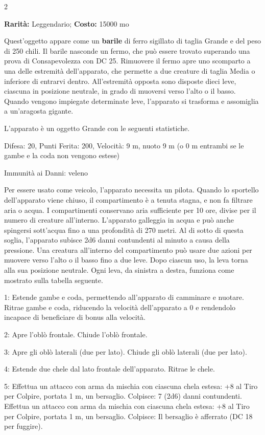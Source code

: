\begin{multicols}{2}

\textbf{Rarità:} Leggendario; \textbf{Costo:} 15000 mo

Quest'oggetto appare come un \textbf{barile} di ferro sigillato di taglia Grande e del peso di 250 chili. Il barile nasconde un fermo, che può essere trovato superando una prova di Consapevolezza con DC 25. Rimuovere il fermo apre uno scomparto a una delle estremità dell'apparato, che permette a due creature di taglia Media o inferiore di entrarvi dentro. All'estremità opposta sono disposte dieci leve, ciascuna in posizione neutrale, in grado di muoversi verso l'alto o il basso. Quando vengono impiegate determinate leve, l'apparato si trasforma e assomiglia a un'aragosta gigante.

L'apparato è un oggetto Grande con le seguenti statistiche.

Difesa: 20, Punti Ferita: 200, Velocità: 9 m, nuoto 9 m (o 0 m entrambi se le gambe e la coda non vengono estese)

Immunità ai Danni: veleno

Per essere usato come veicolo, l'apparato necessita un pilota. Quando lo sportello dell'apparato viene chiuso, il compartimento è a tenuta stagna, e non fa filtrare aria o acqua. I compartimenti conservano aria sufficiente per 10 ore, divise per il numero di creature all'interno. L'apparato galleggia in acqua e può anche spingersi sott'acqua fino a una profondità di 270 metri. Al di sotto di questa soglia, l'apparato subisce 2d6 danni contundenti al minuto a causa della pressione. Una creatura all'interno del compartimento può usare due azioni per muovere verso l'alto o il basso fino a due leve. Dopo ciascun uso, la leva torna alla sua posizione neutrale. Ogni leva, da sinistra a destra, funziona come mostrato sulla tabella seguente.

1: Estende gambe e coda, permettendo all'apparato di camminare e nuotare. Ritrae gambe e coda, riducendo la velocità dell'apparato a 0 e rendendolo incapace di beneficiare di bonus alla velocità.

2: Apre l'oblò frontale. Chiude l'oblò frontale.

3: Apre gli oblò laterali (due per lato). Chiude gli oblò laterali (due per lato).

4: Estende due chele dal lato frontale dell'apparato. Ritrae le chele.

5: Effettua un attacco con arma da mischia con ciascuna chela estesa: +8 al Tiro per Colpire, portata 1 m, un bersaglio. Colpisce: 7 (2d6) danni contundenti. Effettua un attacco con arma da mischia con ciascuna chela estesa: +8 al Tiro per Colpire, portata 1 m, un bersaglio. Colpisce: Il bersaglio è afferrato (DC 18 per fuggire).


\end{multicols}
